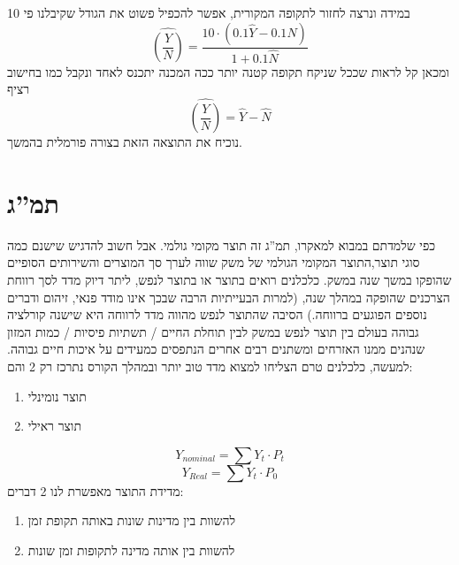 \documentclass[a4paper,12pt]{article}
\begin{document}
\begin{RTL}
\begin{hebrew}
במידה ונרצה לחזור לתקופה המקורית, אפשר להכפיל פשוט את הגודל שקיבלנו פי 10
\begin{equation*}
    \widehat{\left(\frac{Y}{N}\right)}
    = \dfrac{10\cdot(0.1\widehat Y - 0.1 \widehat N)} {1 + 0.1\widehat N}
\end{equation*}
ומכאן קל לראות שככל שניקח תקופה קטנה יותר ככה המכנה יתכנס לאחד ונקבל כמו בחישוב רציף
\begin{equation*}
    \widehat{\left(\frac{Y}{N}\right) }= \widehat Y - \widehat N
\end{equation*}
נוכיח את התוצאה הזאת בצורה פורמלית בהמשך.
\newpage

\section{תמ''ג}
כפי שלמדתם במבוא למאקרו, תמ''ג זה תוצר מקומי גולמי. אבל חשוב להדגיש שישנם כמה סוגי תוצר,התוצר המקומי הגולמי של משק שווה לערך סך המוצרים והשירותים הסופיים שהופקו במשך שנה במשק.
כלכלנים רואים בתוצר או בתוצר לנפש, ליתר דיוק  מדד לסך רווחת הצרכנים שהופקה במהלך שנה, (למרות
הבעייתיות הרבה שבכך אינו מודד פנאי, זיהום ודברים נוספים הפוגעים ברווחה.) הסיבה שהתוצר לנפש
מהווה מדד לרווחה היא שישנה קורלציה גבוהה בעולם בין תוצר לנפש במשק לבין תוחלת החיים / תשתיות
פיסיות / כמות המזון שנהנים ממנו האזרחים ומשתנים רבים אחרים הנתפסים כמעידים על איכות חיים
גבוהה. למעשה, כלכלנים טרם הצליחו למצוא מדד טוב יותר ובמהלך הקורס נתרכז רק 2 והם:    
\begin{enumerate}
    \item תוצר נומינלי
    \item תוצר ראילי
\end{enumerate}
\begin{equation*}
    Y_{{nominal}}=\sum Y_t \cdot P_t
\end{equation*}
\begin{equation*}
    Y_{{Real}}=\sum Y_t \cdot P_0
\end{equation*}
מדידת התוצר מאפשרת לנו 2 דברים:
\begin{enumerate}

    \item להשוות בין מדינות שונות באותה תקופת זמן
    \item להשוות בין אותה מדינה לתקופות זמן שונות
\end{enumerate}


\end{hebrew}
\end{RTL}
\end{document}
